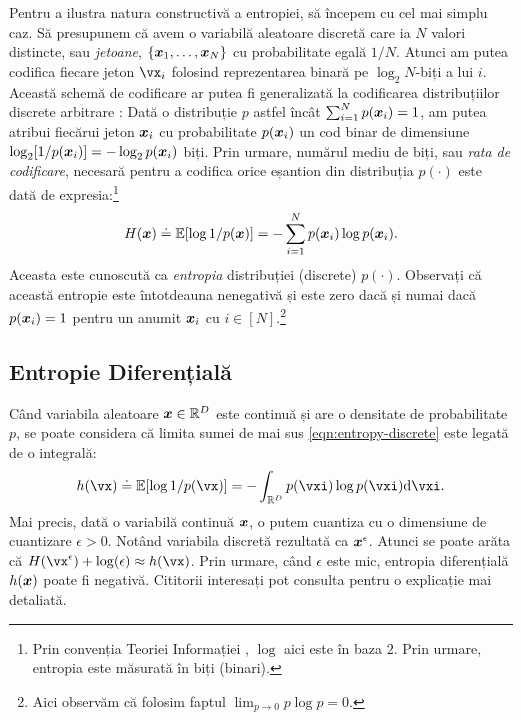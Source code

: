 \documentclass[../../book-main_ro.tex]{subfiles}
\begin{document}
Pentru a ilustra natura constructivă a entropiei, să începem cu cel mai simplu caz. Să presupunem că avem o variabilă aleatoare discretă care ia $N$ valori distincte, sau \textit{jetoane}, $\{\bm{x}_1, \ldots, \bm{x}_N\}$ cu probabilitate egală $1/N$. Atunci am putea codifica fiecare jeton \(\vx_{i}\) folosind reprezentarea binară pe \(\log_2 N\)-biți a lui \(i\). Această schemă de codificare ar putea fi generalizată la codificarea distribuțiilor discrete arbitrare \cite{Cover-Thomas}: Dată o distribuție \(p\) astfel încât $\sum_{i=1}^N p(\bm{x}_i) = 1$, am putea atribui fiecărui jeton $\bm{x}_i$ cu probabilitate $p(\bm{x}_i)$ un cod binar de dimensiune $\log_2 [1/p(\bm{x}_i)] = - \log_2 p(\bm{x}_i)$ biți. Prin urmare, numărul mediu de biți, sau {\em rata de codificare}, necesară pentru a codifica orice eșantion din distribuția $p(\cdot)$ este dată de expresia:\footnote{Prin convenția Teoriei Informației \cite{Cover-Thomas}, $\log$ aici este în baza $2$. Prin urmare, entropia este măsurată în biți (binari).}
\begin{equation}
	H(\bm{x}) \doteq \mathbb{E}[\log 1/p(\bm{x})]  = - \sum_{i=1}^N p(\bm{x}_i) \log  p(\bm{x}_i).
	\label{eqn:entropy-discrete}
\end{equation}
Aceasta este cunoscută ca {\em entropia} distribuției (discrete) $p(\cdot)$. Observați că această entropie este întotdeauna nenegativă și este zero dacă și numai dacă $p(\bm{x}_i) = 1$ pentru un anumit $\bm{x}_i$ cu $i \in [N]$.\footnote{Aici observăm că folosim faptul $\lim_{p\rightarrow 0} p \log p = 0$.}


\subsection{Entropie Diferențială}

Când variabila aleatoare $\bm{x} \in \mathbb{R}^{D}$ este continuă și are o densitate de probabilitate $p$, se poate considera că limita sumei de mai sus \eqref{eqn:entropy-discrete} este legată de o integrală:
\begin{equation}
	h(\vx) \doteq \Ex[\log 1/p(\vx)] = - \int_{\R^{D}} p(\vxi) \log p(\vxi) \odif{\vxi}.
	\label{eqn:entropy-differential}
\end{equation}
{Mai precis, dată o variabilă continuă $\bm{x}$, o putem cuantiza cu o dimensiune de cuantizare $\epsilon > 0$. Notând variabila discretă rezultată ca $\bm{x}^\epsilon$. Atunci se poate arăta că $H(\vx^\epsilon) + \log(\epsilon) \approx h(\vx)$. Prin urmare, când $\epsilon$ este mic, entropia diferențială $h(\bm{x})$ poate fi negativă. Cititorii interesați pot consulta \cite{Cover-Thomas} pentru o explicație mai detaliată.}
\end{document}
